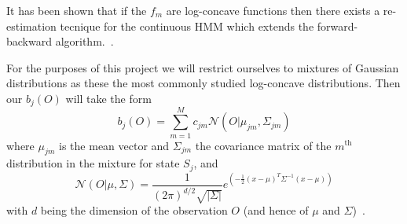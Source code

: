 It has been shown that if the $f_m$ are log-concave functions then there exists a re-estimation tecnique for the continuous HMM which extends the forward-backward algorithm.~\cite{liporace1982maximum, juang1985maximum, juang1986maximum}. 

For the purposes of this project we will restrict ourselves to mixtures of Gaussian distributions as these the most commonly studied log-concave distributions. Then our $b_j(O)$ will take the form
\begin{equation*}
b_j(O) = \sum_{m=1}^M c_{jm}\mathcal{N}(O | \mu_{jm}, \Sigma_{jm})
\end{equation*}
where $\mu_{jm}$ is the mean vector and $\Sigma_{jm}$ the covariance matrix of the $m^\text{th}$ distribution in the mixture for state $S_j$, and  
\begin{equation*}
\mathcal{N}(O|\mu,\Sigma) = \frac{1}{(2\pi)^{d/2}\sqrt{|\Sigma|}}e^{\left(-\frac{1}{2}(x-\mu)^T\Sigma^{-1}(x-\mu)\right)}
\end{equation*}
with $d$ being the dimension of the observation $O$ (and hence of $\mu$ and $\Sigma$)~\citep{bishop2006pattern}.
